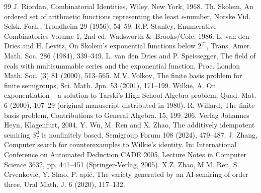 \documentclass[eqnor,reqno]{amsart}
\theoremstyle{plain}
\theoremstyle{definition}
\begin{document}
\begin{thebibliography}{99}
 J. Riordan, Combinatorial Identities, Wiley, New York, 1968.
 Th. Skolem, An ordered set of arithmetic functions representing the least  $\epsilon$-number,
Norske Vid. Selsk. Forh., Trondheim 29 (1956), 54--59.
 R.P. Stanley, Enumerative Combinatorics Volume 1, 2nd ed. Wadsworth \&\ Brooks/Cole, 1986.
 L. van den Dries and H. Levitz, On Skolem's exponential functions below $2^{2^x}$, Trans. Amer. Math. Soc. 286 (1984), 339--349.
 L. van den Dries and P. Speissegger, The field of reals with multisummable series and the exponential function, Proc. London Math. Soc. (3) 81 (2000),  513--565.
 M.V. Volkov, The finite basis problem for finite semigroups, Sci. Math. Jpn. 53 (2001),  171--199.
 Wilkie, A. On exponentiation -- a solution to Tarski's
High School Algebra problem, Quad. Mat.  6 (2000), 107--29 (original manuscript distributed in 1980).
 R. Willard, 
The finite basis problem, Contributions to General Algebra. 15, 199--206.
Verlag Johannes Heyn, Klagenfurt, 2004.
 Y. Wu, M. Ren and X. Zhao, The additively idempotent semiring $S_7^0$ is nonfinitely based, Semigroup Forum 108 (2024), 479--487.
 J. Zhang, Computer search for counterexamples to Wilkie’s identity. In: International Conference on Automated Deduction CADE 2005, Lecture Notes in Computer Science 3632,
pp. 441--451 (Springer-Verlag, 2005).
 X.Z. Zhao, M.M. Ren, S. Crvenkovi\'c, Y. Shao, P. {\DJ}api\'c, The variety generated by an AI-semiring
of order three, Ural Math. J. 6 (2020), 117--132.
\end{thebibliography}
\end{document}
